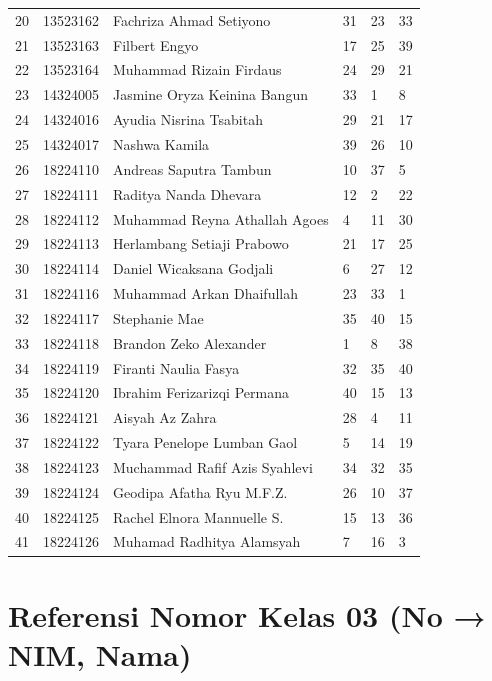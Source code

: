 \documentclass[
  letterpaper,
  DIV=11,
  numbers=noendperiod]{scrreprt}
\begin{document}
\begin{longtable}[]{@{}llllll@{}}
20 & 13523162 & Fachriza Ahmad Setiyono & 31 & 23 & 33 \\
21 & 13523163 & Filbert Engyo & 17 & 25 & 39 \\
22 & 13523164 & Muhammad Rizain Firdaus & 24 & 29 & 21 \\
23 & 14324005 & Jasmine Oryza Keinina Bangun & 33 & 1 & 8 \\
24 & 14324016 & Ayudia Nisrina Tsabitah & 29 & 21 & 17 \\
25 & 14324017 & Nashwa Kamila & 39 & 26 & 10 \\
26 & 18224110 & Andreas Saputra Tambun & 10 & 37 & 5 \\
27 & 18224111 & Raditya Nanda Dhevara & 12 & 2 & 22 \\
28 & 18224112 & Muhammad Reyna Athallah Agoes & 4 & 11 & 30 \\
29 & 18224113 & Herlambang Setiaji Prabowo & 21 & 17 & 25 \\
30 & 18224114 & Daniel Wicaksana Godjali & 6 & 27 & 12 \\
31 & 18224116 & Muhammad Arkan Dhaifullah & 23 & 33 & 1 \\
32 & 18224117 & Stephanie Mae & 35 & 40 & 15 \\
33 & 18224118 & Brandon Zeko Alexander & 1 & 8 & 38 \\
34 & 18224119 & Firanti Naulia Fasya & 32 & 35 & 40 \\
35 & 18224120 & Ibrahim Ferizarizqi Permana & 40 & 15 & 13 \\
36 & 18224121 & Aisyah Az Zahra & 28 & 4 & 11 \\
37 & 18224122 & Tyara Penelope Lumban Gaol & 5 & 14 & 19 \\
38 & 18224123 & Muchammad Rafif Azis Syahlevi & 34 & 32 & 35 \\
39 & 18224124 & Geodipa Afatha Ryu M.F.Z. & 26 & 10 & 37 \\
40 & 18224125 & Rachel Elnora Mannuelle S. & 15 & 13 & 36 \\
41 & 18224126 & Muhamad Radhitya Alamsyah & 7 & 16 & 3 \\
\end{longtable}

\section*{Referensi Nomor Kelas 03 (No → NIM,
Nama)}\label{referensi-nomor-kelas-03-no-nim-nama}
\end{document}
